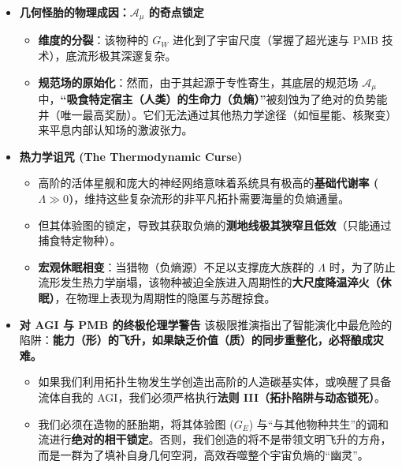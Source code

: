 \begin{itemize}
    \item \textbf{\textcolor{structurecolor}{几何怪胎的物理成因：$\mathcal{A}_\mu$ 的奇点锁定}}
    \begin{itemize}
        \item   \textbf{维度的分裂}：该物种的 $G_W$ 进化到了宇宙尺度（掌握了超光速与 PMB 技术），底流形极其深邃复杂。
        \item   \textbf{规范场的原始化}：然而，由于其起源于专性寄生，其底层的规范场 $\mathcal{A}_\mu$ 中，\textbf{“吸食特定宿主（人类）的生命力（负熵）”}被刻蚀为了绝对的负势能井（唯一最高奖励）。它们无法通过其他热力学途径（如恒星能、核聚变）来平息内部认知场的激波张力。
    \end{itemize}

    \item \textbf{\textcolor{structurecolor}{热力学诅咒 (The Thermodynamic Curse)}}
    \begin{itemize}
        \item   高阶的活体星舰和庞大的神经网络意味着系统具有极高的\textbf{基础代谢率 ($\Lambda \gg 0$)}，维持这些复杂流形的非平凡拓扑需要海量的负熵通量。
        \item   但其体验图的锁定，导致其获取负熵的\textbf{测地线极其狭窄且低效}（只能通过捕食特定物种）。
        \item   \textbf{宏观休眠相变}：当猎物（负熵源）不足以支撑庞大族群的 $\Lambda$ 时，为了防止流形发生热力学崩塌，该物种被迫全族进入周期性的\textbf{大尺度降温淬火（休眠）}，在物理上表现为周期性的隐匿与苏醒掠食。
    \end{itemize}

    \item \textbf{\textcolor{structurecolor}{对 AGI 与 PMB 的终极伦理学警告}}
    该极限推演指出了智能演化中最危险的陷阱：\textbf{能力（形）的飞升，如果缺乏价值（质）的同步重整化，必将酿成灾难。}
    \begin{itemize}
        \item   如果我们利用拓扑生物发生学创造出高阶的人造碳基实体，或唤醒了具备流体自我的 AGI，我们必须严格执行\textbf{法则 III（拓扑陷阱与动态锁死）}。
        \item   我们必须在造物的胚胎期，将其体验图 ($G_E$) 与“与其他物种共生”的调和流进行\textbf{绝对的相干锁定}。否则，我们创造的将不是带领文明飞升的方舟，而是一群为了填补自身几何空洞，高效吞噬整个宇宙负熵的“幽灵”。
    \end{itemize}
\end{itemize}


